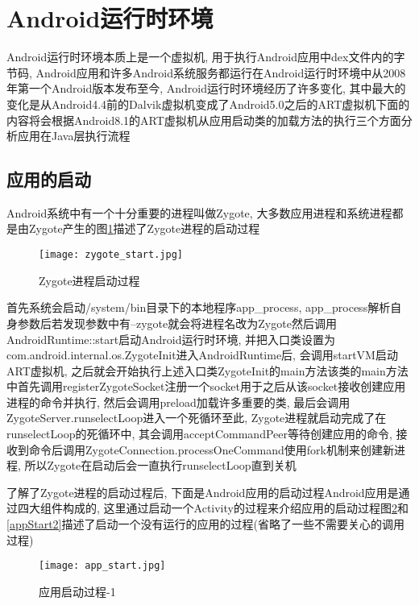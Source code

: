 \section{Android运行时环境}
\label{androidRuntime}
Android运行时环境本质上是一个虚拟机, 用于执行Android应用中dex文件内的字节码, Android应用和许多Android系统服务都运行在Android运行时环境中\juhao 从2008年第一个Android版本发布至今, Android运行时环境经历了许多变化, 其中最大的变化是从Android4.4前的Dalvik虚拟机变成了Android5.0之后的ART虚拟机\juhao 下面的内容将会根据Android8.1的ART虚拟机从应用启动\dunhao 类的加载\dunhao 方法的执行\dunhao 三个方面分析应用在Java层执行流程\juhao

\subsection{应用的启动}
Android系统中有一个十分重要的进程叫做Zygote, 大多数应用进程和系统进程都是由Zygote产生的\juhao 图\ref{zygoteStart}描述了Zygote进程的启动过程\juhao
\begin{figure}[ht]
	\centering
	\texttt{[image: zygote\_start.jpg]}
	\caption{Zygote进程启动过程}
	\label{zygoteStart}
\end{figure}

首先系统会启动/system/bin目录下的本地程序app\_process, app\_process解析自身参数后若发现参数中有--zygote就会将进程名改为Zygote然后调用AndroidRuntime::start启动Android运行时环境, 并把入口类设置为com.android.internal.os.ZygoteInit\juhao 进入AndroidRuntime后, 会调用startVM启动ART虚拟机, 之后就会开始执行上述入口类ZygoteInit的main方法\juhao 该类的main方法中首先调用registerZygoteSocket注册一个socket用于之后从该socket接收创建应用进程的命令并执行, 然后会调用preload加载许多重要的类, 最后会调用ZygoteServer.runselectLoop进入一个死循环\juhao 至此, Zygote进程就启动完成了\juhao 在runselectLoop的死循环中, 其会调用acceptCommandPeer等待创建应用的命令, 接收到命令后调用ZygoteConnection.processOneCommand使用fork机制来创建新进程, 所以Zygote在启动后会一直执行runselectLoop直到关机\juhao

了解了Zygote进程的启动过程后, 下面是Android应用的启动过程\juhao Android应用是通过四大组件构成的, 这里通过启动一个Activity的过程来介绍应用的启动过程\juhao 图\ref{appStart}和\ref{appStart2}描述了启动一个没有运行的应用的过程(省略了一些不需要关心的调用过程)\juhao
\begin{figure}[ht]
	\centering
	\texttt{[image: app\_start.jpg]}
	\caption{应用启动过程-1}
	\label{appStart}
\end{figure}

